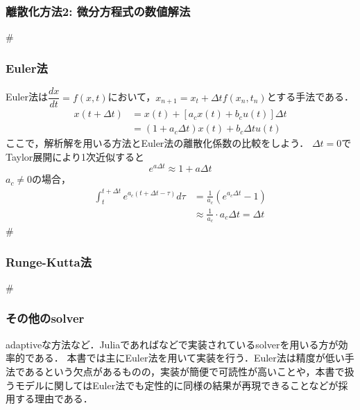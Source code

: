 \subsubsection{離散化方法2: 微分方程式の数値解法}#\subsubsection{Euler法}Euler法は$\dfrac{dx}{dt}=f(x, t)$において，$x_{n+1}=x_t+\Delta t f(x_n, t_n)$とする手法である．
$$
\begin{aligned}
x(t+\Delta t)&=x(t) + \left[a_c x(t)+b_c u(t) \right]\Delta t\\
&=(1+a_c \Delta t)x(t) + b_c\Delta t u(t
)
\end{aligned}
$$
ここで，解析解を用いる方法とEuler法の離散化係数の比較をしよう．
$\Delta t=0$でTaylor展開により1次近似すると
$$
e^{a \Delta t} \approx 1 + a\Delta t
$$
$a_c\neq 0$の場合，
$$
\begin{aligned}
\int_t^{t+\Delta t} e^{a_c(t+\Delta t-\tau)} d\tau&=\frac{1}{a_c}(e^{a_c \Delta t}-1)\\
&\approx \frac{1}{a_c}\cdot a_c \Delta t=\Delta t
\end{aligned}
$$
#\subsubsection{Runge-Kutta法}#\subsubsection{その他のsolver}adaptiveな方法など．Juliaであればなどで実装されているsolverを用いる方が効率的である．
本書では主にEuler法を用いて実装を行う．Euler法は精度が低い手法であるという欠点があるものの，実装が簡便で可読性が高いことや，本書で扱うモデルに関してはEuler法でも定性的に同様の結果が再現できることなどが採用する理由である．